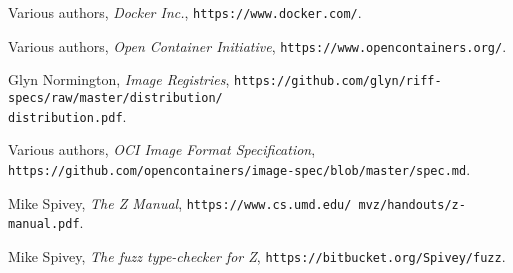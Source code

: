 \documentclass[a4paper,twoside,12pt]{article}
\begin{document}
\newpage
\begin{flushleft}
\renewcommand\refname{Bibliography}
\begin{thebibliography}{99}
\label{sec:references}


  Various authors,
  \emph{Docker Inc.},
  \texttt{https://www.docker.com/}.

  Various authors,
  \emph{Open Container Initiative},
  \texttt{https://www.opencontainers.org/}.

  Glyn Normington,
  \emph{Image Registries},
  \texttt{https://github.com/glyn/riff-specs/raw/master/distribution/}\\\texttt{distribution.pdf}.

  Various authors,
  \emph{OCI Image Format Specification},
  \texttt{https://github.com/opencontainers/image-spec/blob/master/spec.md}.

  Mike Spivey,
  \emph{The Z Manual},
  \texttt{https://www.cs.umd.edu/ mvz/handouts/z-manual.pdf}.

  Mike Spivey,
  \emph{The fuzz type-checker for Z},
  \texttt{https://bitbucket.org/Spivey/fuzz}.


\end{thebibliography}
\end{flushleft}

\newpage

\end{document}
